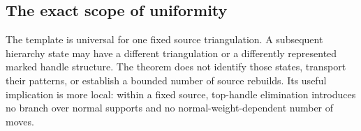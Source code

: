 \subsection{The exact scope of uniformity}

The template is universal for one fixed source triangulation. A subsequent
hierarchy state may have a different triangulation or a differently
represented marked handle structure. The theorem does not identify those
states, transport their patterns, or establish a bounded number of source
rebuilds. Its useful implication is more local: within a fixed source,
top-handle elimination introduces no branch over normal supports and no
normal-weight-dependent number of moves.
